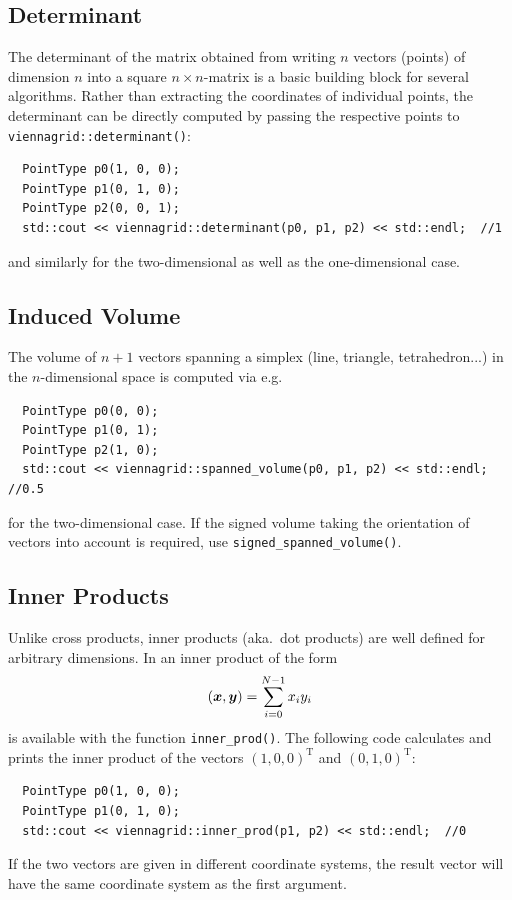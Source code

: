  \subsection{Determinant}
 The determinant of the matrix obtained from writing $n$ vectors (points) of dimension $n$ into a square $n\times n$-matrix is a basic building block for several algorithms.
 Rather than extracting the coordinates of individual points, the determinant can be directly computed by passing the respective points to \lstinline|viennagrid::determinant()|:
 \begin{lstlisting}
  PointType p0(1, 0, 0);
  PointType p1(0, 1, 0);
  PointType p2(0, 0, 1);
  std::cout << viennagrid::determinant(p0, p1, p2) << std::endl;  //1
 \end{lstlisting}
 and similarly for the two-dimensional as well as the one-dimensional case.

 \subsection{Induced Volume}
 The volume of $n+1$ vectors spanning a simplex (line, triangle, tetrahedron...) in the $n$-dimensional space is computed via e.g.
 \begin{lstlisting}
  PointType p0(0, 0);
  PointType p1(0, 1);
  PointType p2(1, 0);
  std::cout << viennagrid::spanned_volume(p0, p1, p2) << std::endl;  //0.5
 \end{lstlisting}
 for the two-dimensional case. If the signed volume taking the orientation of vectors into account is required, use \lstinline|signed_spanned_volume()|.

  \subsection{Inner Products}
 Unlike cross products, inner products (aka.~dot products) are well defined for arbitrary dimensions. In {\ViennaGridversion} an inner product of the form
\begin{align}
 (\boldsymbol{x}, \boldsymbol{y}) = \sum_{i=0}^{N-1} x_i y_i
\end{align}
is available with the function \lstinline|inner_prod()|. The following code calculates and prints the inner product of the vectors $(1,0,0)^\mathrm{T}$ and $(0,1,0)^\mathrm{T}$:
 \begin{lstlisting}
  PointType p0(1, 0, 0);
  PointType p1(0, 1, 0);
  std::cout << viennagrid::inner_prod(p1, p2) << std::endl;  //0
 \end{lstlisting}
 If the two vectors are given in different coordinate systems, the result vector will have the same coordinate system as the first argument.

